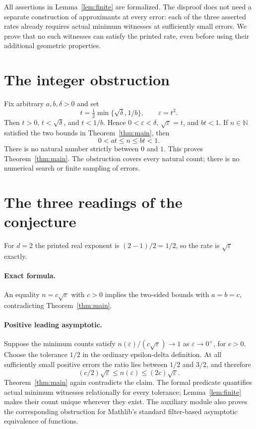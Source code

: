 \documentclass[11pt,letterpaper]{article}
\newcommand{\N}{\mathbb{N}}
\begin{document}
All assertions in Lemma~\ref{lem:finite} are formalized. The disproof
does not need a separate construction of approximants at every error:
each of the three asserted rates already requires actual minimum
witnesses at sufficiently small errors. We prove that no such witnesses
can satisfy the printed rate, even before using their additional
geometric properties.

\section{The integer obstruction}
Fix arbitrary $a,b,\delta>0$ and set
\[
 t=\tfrac12\min\{\sqrt\delta,1/b\},\qquad \varepsilon=t^2.
\]
Then $t>0$, $t<\sqrt\delta$, and $t<1/b$. Hence
$0<\varepsilon<\delta$, $\sqrt\varepsilon=t$, and $bt<1$.
If $n\in\N$ satisfied the two bounds in Theorem~\ref{thm:main}, then
\[
 0<at\leq n\leq bt<1.
\]
There is no natural number strictly between $0$ and $1$. This proves
Theorem~\ref{thm:main}. The obstruction covers every natural count;
there is no numerical search or finite sampling of errors.

\newpage
\section{The three readings of the conjecture}
For $d=2$ the printed real exponent is $(2-1)/2=1/2$, so the rate is
$\sqrt\varepsilon$ exactly.

\paragraph{Exact formula.}
An equality $n=c\sqrt\varepsilon$ with $c>0$ implies the two-sided bounds
with $a=b=c$, contradicting Theorem~\ref{thm:main}.

\paragraph{Positive leading asymptotic.}
Suppose the minimum counts satisfy
$n(\varepsilon)/(c\sqrt\varepsilon)\longrightarrow1$ as
$\varepsilon\to0^+$, for $c>0$. Choose the tolerance $1/2$ in the
ordinary epsilon-delta definition. At all sufficiently small positive
errors the ratio lies between $1/2$ and $3/2$, and therefore
\[
 (c/2)\sqrt\varepsilon\leq n(\varepsilon)
 \leq (2c)\sqrt\varepsilon.
\]
Theorem~\ref{thm:main} again contradicts the claim. The formal predicate
quantifies actual minimum witnesses relationally for every tolerance;
Lemma~\ref{lem:finite} makes their count unique wherever they exist.
The auxiliary module also proves the corresponding obstruction for
Mathlib's standard filter-based asymptotic equivalence of functions.
\end{document}
